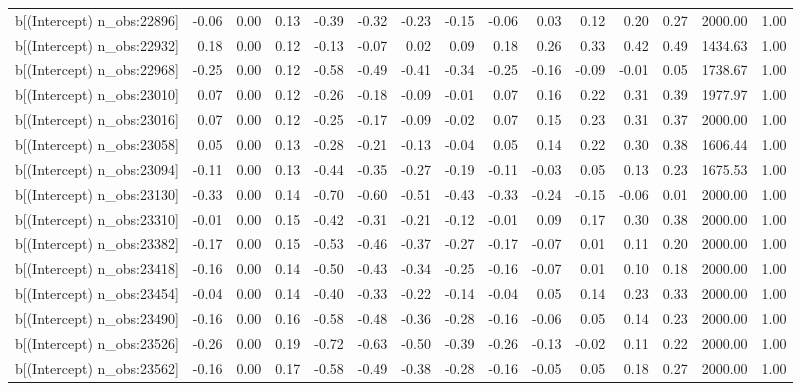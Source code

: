 \begin{table}[ht]
\begin{tabular}{rrrrrrrrrrrrrrr}
  b[(Intercept) n\_obs:22896] & -0.06 & 0.00 & 0.13 & -0.39 & -0.32 & -0.23 & -0.15 & -0.06 & 0.03 & 0.12 & 0.20 & 0.27 & 2000.00 & 1.00 \\ 
  b[(Intercept) n\_obs:22932] & 0.18 & 0.00 & 0.12 & -0.13 & -0.07 & 0.02 & 0.09 & 0.18 & 0.26 & 0.33 & 0.42 & 0.49 & 1434.63 & 1.00 \\ 
  b[(Intercept) n\_obs:22968] & -0.25 & 0.00 & 0.12 & -0.58 & -0.49 & -0.41 & -0.34 & -0.25 & -0.16 & -0.09 & -0.01 & 0.05 & 1738.67 & 1.00 \\ 
  b[(Intercept) n\_obs:23010] & 0.07 & 0.00 & 0.12 & -0.26 & -0.18 & -0.09 & -0.01 & 0.07 & 0.16 & 0.22 & 0.31 & 0.39 & 1977.97 & 1.00 \\ 
  b[(Intercept) n\_obs:23016] & 0.07 & 0.00 & 0.12 & -0.25 & -0.17 & -0.09 & -0.02 & 0.07 & 0.15 & 0.23 & 0.31 & 0.37 & 2000.00 & 1.00 \\ 
  b[(Intercept) n\_obs:23058] & 0.05 & 0.00 & 0.13 & -0.28 & -0.21 & -0.13 & -0.04 & 0.05 & 0.14 & 0.22 & 0.30 & 0.38 & 1606.44 & 1.00 \\ 
  b[(Intercept) n\_obs:23094] & -0.11 & 0.00 & 0.13 & -0.44 & -0.35 & -0.27 & -0.19 & -0.11 & -0.03 & 0.05 & 0.13 & 0.23 & 1675.53 & 1.00 \\ 
  b[(Intercept) n\_obs:23130] & -0.33 & 0.00 & 0.14 & -0.70 & -0.60 & -0.51 & -0.43 & -0.33 & -0.24 & -0.15 & -0.06 & 0.01 & 2000.00 & 1.00 \\ 
  b[(Intercept) n\_obs:23310] & -0.01 & 0.00 & 0.15 & -0.42 & -0.31 & -0.21 & -0.12 & -0.01 & 0.09 & 0.17 & 0.30 & 0.38 & 2000.00 & 1.00 \\ 
  b[(Intercept) n\_obs:23382] & -0.17 & 0.00 & 0.15 & -0.53 & -0.46 & -0.37 & -0.27 & -0.17 & -0.07 & 0.01 & 0.11 & 0.20 & 2000.00 & 1.00 \\ 
  b[(Intercept) n\_obs:23418] & -0.16 & 0.00 & 0.14 & -0.50 & -0.43 & -0.34 & -0.25 & -0.16 & -0.07 & 0.01 & 0.10 & 0.18 & 2000.00 & 1.00 \\ 
  b[(Intercept) n\_obs:23454] & -0.04 & 0.00 & 0.14 & -0.40 & -0.33 & -0.22 & -0.14 & -0.04 & 0.05 & 0.14 & 0.23 & 0.33 & 2000.00 & 1.00 \\ 
  b[(Intercept) n\_obs:23490] & -0.16 & 0.00 & 0.16 & -0.58 & -0.48 & -0.36 & -0.28 & -0.16 & -0.06 & 0.05 & 0.14 & 0.23 & 2000.00 & 1.00 \\ 
  b[(Intercept) n\_obs:23526] & -0.26 & 0.00 & 0.19 & -0.72 & -0.63 & -0.50 & -0.39 & -0.26 & -0.13 & -0.02 & 0.11 & 0.22 & 2000.00 & 1.00 \\ 
  b[(Intercept) n\_obs:23562] & -0.16 & 0.00 & 0.17 & -0.58 & -0.49 & -0.38 & -0.28 & -0.16 & -0.05 & 0.05 & 0.18 & 0.27 & 2000.00 & 1.00 \\ 

\end{tabular}
\end{table}
